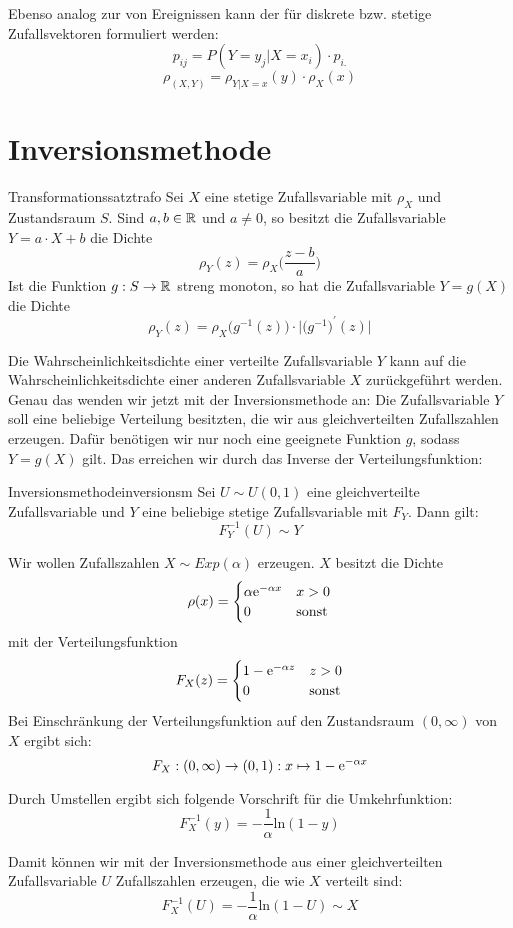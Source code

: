 Ebenso analog zur  von Ereignissen kann
der  für diskrete bzw. stetige Zufallsvektoren
formuliert werden:
\[p_{ij} = P(Y=y_j|X=x_i)\cdot p_{i.}\]
\[\rho_{(X,Y)} = \rho_{Y|X=x}(y)\cdot\rho_X(x)\]

\section{Inversionsmethode}

\begin{theorem}{Transformationssatz}{trafo}
Sei $X$ eine stetige Zufallsvariable mit  $\rho_X$ und
Zustandsraum $S$. Sind $a,b\in\mathbb{R}$ und $a \ne 0$, so besitzt die Zufallsvariable
$Y = a\cdot X + b$ die Dichte
\[\rho_Y(z) = \rho_X\Big(\frac{z-b}{a}\Big)\]
Ist die Funktion $g:S\to\mathbb{R}$ streng monoton, so hat die Zufallsvariable $Y=g(X)$
die Dichte
\[\rho_Y(z) = \rho_X\big(g^{-1}(z)\big)\cdot\big|\big(g^{-1}\big)^\prime(z)\big|\]
\end{theorem}

Die Wahrscheinlichkeitsdichte einer verteilte Zufallsvariable $Y$ kann auf die
Wahrscheinlichkeitsdichte einer anderen Zufallsvariable $X$ zurückgeführt
werden. Genau das wenden wir jetzt mit der Inversionsmethode an: Die
Zufallsvariable $Y$ soll eine beliebige Verteilung besitzten, die wir aus
gleichverteilten Zufallszahlen erzeugen. Dafür benötigen wir nur noch eine
geeignete Funktion $g$, sodass $Y=g(X)$ gilt. Das erreichen wir durch das
Inverse der Verteilungsfunktion:

\begin{theorem}{Inversionsmethode}{inversionsm}
Sei $U\sim U(0,1)$ eine gleichverteilte Zufallsvariable und $Y$ eine
beliebige stetige Zufallsvariable mit 
$F_Y$. Dann gilt:
\[F_Y^{-1}(U) \sim Y\]
\end{theorem}

\begin{example}
Wir wollen Zufallszahlen $X\sim Exp(\alpha)$ erzeugen. $X$ besitzt die Dichte
\[
\rho(x) = \begin{cases}
\alpha \mathrm{e}^{-\alpha x} & x > 0 \\
0 & \text{sonst}
\end{cases}
\]
mit der Verteilungsfunktion
\[
F_X(z) = \begin{cases}
1- \mathrm{e}^{-\alpha z} & z > 0 \\
0 & \text{sonst}
\end{cases}
\]
Bei Einschränkung der Verteilungsfunktion auf den Zustandsraum $(0, \infty)$ von
$X$ ergibt sich:
\[F_X: (0,\infty)\to(0,1):x\mapsto1-\mathrm{e}^{-\alpha x}\]

Durch Umstellen ergibt sich folgende Vorschrift für die Umkehrfunktion:
\[F_X^{-1}(y) = -\frac{1}{\alpha} \mathrm{ln}(1-y)\]

Damit können wir mit der Inversionsmethode aus einer gleichverteilten
Zufallsvariable $U$ Zufallszahlen erzeugen, die wie $X$ verteilt sind:
\[F_X^{-1}(U) = -\frac{1}{\alpha} \mathrm{ln}(1-U) \sim X\]

\end{example}


